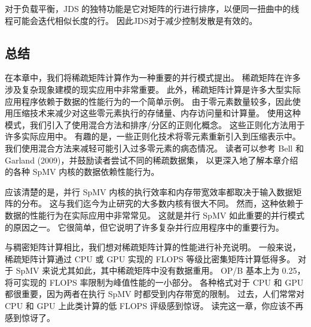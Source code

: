 对于负载平衡，JDS 的独特功能是它对矩阵的行进行排序，以便同一扭曲中的线程可能会迭代相似长度的行。 
因此JDS对于减少控制发散是有效的。

\subsection{总结}
在本章中，我们将稀疏矩阵计算作为一种重要的并行模式提出。 稀疏矩阵在许多涉及复杂现象建模的现实应用中非常重要。 
此外，稀疏矩阵计算是许多大型实际应用程序依赖于数据的性能行为的一个简单示例。 
由于零元素数量较多，因此使用压缩技术来减少对这些零元素执行的存储量、内存访问量和计算量。 
使用这种模式，我们引入了使用混合方法和排序/分区的正则化概念。 这些正则化方法用于许多实际应用中。 
有趣的是，一些正则化技术将零元素重新引入到压缩表示中。 我们使用混合方法来减轻可能引入过多零元素的病态情况。 
读者可以参考 Bell 和 Garland (2009)，并鼓励读者尝试不同的稀疏数据集，
以更深入地了解本章介绍的各种 SpMV 内核的数据依赖性能行为。

应该清楚的是，并行 SpMV 内核的执行效率和内存带宽效率都取决于输入数据矩阵的分布。 
这与我们迄今为止研究的大多数内核有很大不同。 然而，这种依赖于数据的性能行为在实际应用中非常常见。 
这就是并行 SpMV 如此重要的并行模式的原因之一。 它很简单，但它说明了许多复杂并行应用程序中的重要行为。

与稠密矩阵计算相比，我们想对稀疏矩阵计算的性能进行补充说明。 
一般来说，稀疏矩阵计算通过 CPU 或 GPU 实现的 FLOPS 等级比密集矩阵计算低得多。 
对于 SpMV 来说尤其如此，其中稀疏矩阵中没有数据重用。 OP/B 基本上为 0.25，将可实现的 FLOPS 率限制为峰值性能的一小部分。 
各种格式对于 CPU 和 GPU 都很重要，因为两者在执行 SpMV 时都受到内存带宽的限制。 
过去，人们常常对 CPU 和 GPU 上此类计算的低 FLOPS 评级感到惊讶。 读完这一章，你应该不再感到惊讶了。
